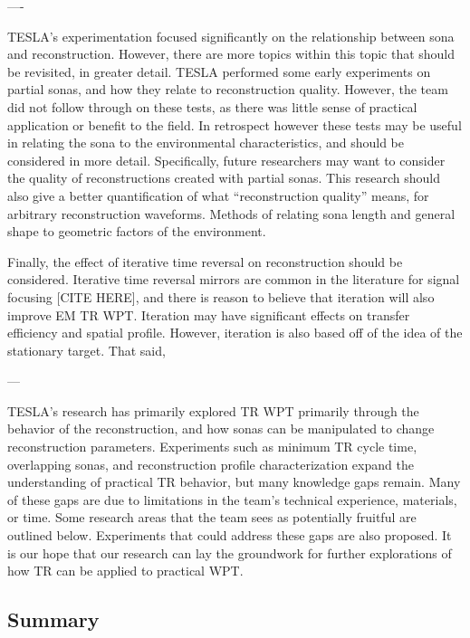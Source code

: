 ----

	TESLA’s experimentation focused significantly on the relationship between sona and reconstruction.  However, there are more topics within this topic that should be revisited, in greater detail.  TESLA performed some early experiments on partial sonas, and how they relate to reconstruction quality.  However, the team did not follow through on these tests, as there was little sense of practical application or benefit to the field.  In retrospect however these tests may be useful in relating the sona to the environmental characteristics, and should be considered in more detail.
	Specifically, future researchers may want to consider the quality of reconstructions created with partial sonas.  This research should also give a better quantification of what “reconstruction quality” means, for arbitrary reconstruction waveforms.  Methods of relating sona length and general shape to geometric factors of the environment.

	Finally, the effect of iterative time reversal on reconstruction should be considered.  Iterative time reversal mirrors are common in the literature for signal focusing [CITE HERE], and there is reason to believe that iteration will also improve EM TR WPT.  Iteration may have significant effects on transfer efficiency and spatial profile.  However, iteration is also based off of the idea of the stationary target.  That said, 

---

TESLA’s research has primarily explored TR WPT primarily through the behavior of the reconstruction, and how sonas can be manipulated to change reconstruction parameters.  Experiments such as minimum TR cycle time, overlapping sonas, and reconstruction profile characterization expand the understanding of practical TR behavior, but many knowledge gaps remain.  Many of these gaps are due to limitations in the team’s technical experience, materials, or time.  Some research areas that the team sees as potentially fruitful are outlined below.  Experiments that could address these gaps are also proposed.  It is our hope that our research can lay the groundwork for further explorations of how TR can be applied to practical WPT.



\subsection{Summary}

